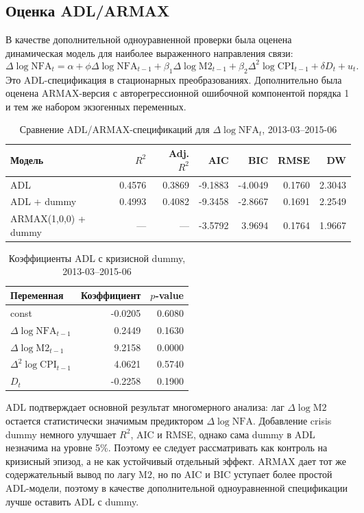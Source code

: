 \documentclass[12pt,a4paper]{article}
\begin{document}
\subsection{Оценка ADL/ARMAX}
В качестве дополнительной одноуравненной проверки была оценена динамическая модель для
наиболее выраженного направления связи:
\[
\Delta \log \mathrm{NFA}_t =
\alpha + \phi \Delta \log \mathrm{NFA}_{t-1}
+ \beta_1 \Delta \log \mathrm{M2}_{t-1}
+ \beta_2 \Delta^2 \log \mathrm{CPI}_{t-1}
+ \delta D_t + u_t.
\]
Это ADL-спецификация в стационарных преобразованиях. Дополнительно была оценена
ARMAX-версия с авторегрессионной ошибочной компонентой порядка 1 и тем же набором
экзогенных переменных.

\begin{table}[H]
\centering
\caption{Сравнение ADL/ARMAX-спецификаций для $\Delta \log \mathrm{NFA}_t$, 2013-03--2015-06}
\small
\begin{tabular}{lrrrrrr}
\toprule
Модель & $R^2$ & Adj. $R^2$ & AIC & BIC & RMSE & DW \\
\midrule
ADL & 0.4576 & 0.3869 & -9.1883 & -4.0049 & 0.1760 & 2.3043 \\
ADL + dummy & 0.4993 & 0.4082 & -9.3458 & -2.8667 & 0.1691 & 2.2549 \\
ARMAX(1,0,0) + dummy & --- & --- & -3.5792 & 3.9694 & 0.1764 & 1.9667 \\
\bottomrule
\end{tabular}
\normalsize
\end{table}

\begin{table}[H]
\centering
\caption{Коэффициенты ADL с кризисной dummy, 2013-03--2015-06}
\begin{tabular}{lrr}
\toprule
Переменная & Коэффициент & $p$-value \\
\midrule
const & -0.0205 & 0.6080 \\
$\Delta \log \mathrm{NFA}_{t-1}$ & 0.2449 & 0.1630 \\
$\Delta \log \mathrm{M2}_{t-1}$ & 9.2158 & 0.0000 \\
$\Delta^2 \log \mathrm{CPI}_{t-1}$ & 4.0621 & 0.5740 \\
$D_t$ & -0.2258 & 0.1900 \\
\bottomrule
\end{tabular}
\end{table}

ADL подтверждает основной результат многомерного анализа: лаг $\Delta \log \mathrm{M2}$ остается
статистически значимым предиктором $\Delta \log \mathrm{NFA}$. Добавление crisis dummy немного
улучшает $R^2$, AIC и RMSE, однако сама dummy в ADL незначима на уровне 5\%. Поэтому ее
следует рассматривать как контроль на кризисный эпизод, а не как устойчивый отдельный
эффект. ARMAX дает тот же содержательный вывод по лагу $\mathrm{M2}$, но по AIC и BIC уступает
более простой ADL-модели, поэтому в качестве дополнительной одноуравненной спецификации
лучше оставить ADL с dummy.
\end{document}
